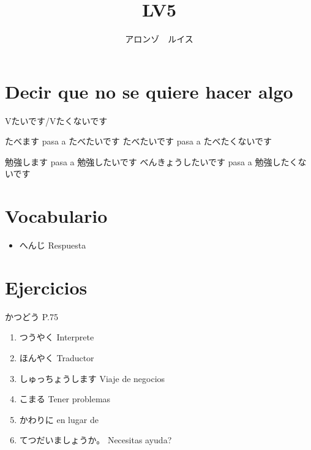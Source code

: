 \documentclass[a4paper,lualatex,ja=standard,base=10pt]{bxjsarticle}
\title{\ruby{第|１０|課}{だい||か} LV5}
\author{アロンゾ　ルイス}
\begin{document}
\setcounter{page}{1}

\maketitle{}
\thispagestyle{fancy}

\section{Decir que no se quiere hacer algo}

Vたいです/Vたくないです

たべます pasa a たべたいです
たべたいです pasa a たべたくないです

勉強します pasa a 勉強したいです
べんきょうしたいです pasa a 勉強したくないです

\section{Vocabulario}

\begin{itemize}
  \item へんじ Respuesta
\end{itemize}

\section{Ejercicios}

かつどう P.75

\begin{enumerate}
  \item つうやく Interprete
  \item ほんやく Traductor
  \item しゅっちょうします Viaje de negocios
  \item こまる Tener problemas
  \item かわりに en lugar de
  \item てつだいましょうか。 Necesitas ayuda?
\end{enumerate}
\end{document}
